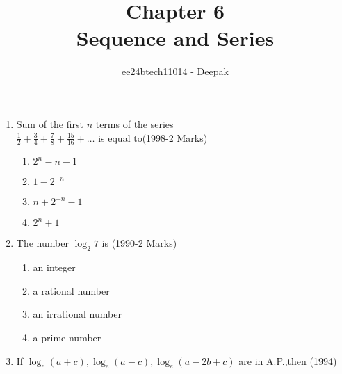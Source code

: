 \documentclass[journal]{IEEEtran}
\theoremstyle{remark}
\begin{document}

\onecolumn

\title{Chapter 6 \\ Sequence and Series}
\author{ee24btech11014 - Deepak}
\maketitle

\renewcommand{\thefigure}{\theenumi}
\renewcommand{\thetable}{\theenumi}

\begin{enumerate}
    \item Sum of the first $ n$ terms of the series \\
$ \frac{1}{2}+ \frac{3}{4}+ \frac{7}{8}+ \frac{15}{16}+ \dots $ is equal to\hfill (1998-2 Marks)
\begin{multicols}{4}
\begin{enumerate}
    \item $2^n-n-1$  
    \item $1-2^{-n}$
    \item $n+2^{-n}-1$
    \item $2^n+1$
    \end{enumerate}
    \end{multicols}
\item The number ${\log_2}7$ is \hfill(1990-2 Marks)
    \begin{multicols}{2}
    \begin{enumerate}
        \item an integer
        \item a rational number
        \item an irrational number
        \item a prime number
    \end{enumerate}
    \end{multicols}
\item If $\log_e(a+c),\log_e(a-c),\log_e(a-2b+c)$ are in A.P.,then \hfill (1994)
    \begin{multicols}{2}
        

\end{multicols}
\end{enumerate}
\end{document}
